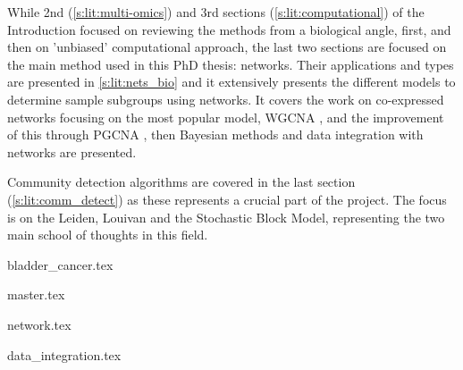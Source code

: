 While 2nd (\cref{s:lit:multi-omics}) and 3rd sections (\ref{s:lit:computational})  of the Introduction focused on reviewing the methods from a biological angle, first, and then on 'unbiased' computational approach, the last two sections are focused on the main method used in this PhD thesis: networks. Their applications and types are presented in \ref{s:lit:nets_bio} and it extensively presents the different models to determine sample subgroups using networks. It covers the work on co-expressed networks focusing on the most popular model, WGCNA \cite{Langfelder2008-sn}, and the improvement of this through PGCNA \cite{Care2019-ij}, then Bayesian methods and data integration with networks are presented. 

Community detection algorithms are covered in the last section (\ref{s:lit:comm_detect}) as these represents a crucial part of the project. The focus is on the Leiden, Louivan and the Stochastic Block Model, representing the two main school of thoughts in this field. 

{bladder_cancer.tex}

\pagebreak

{master.tex}

{network.tex}

{data_integration.tex}


